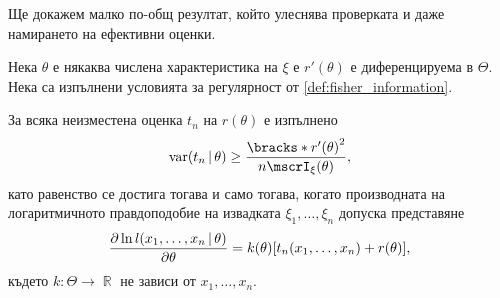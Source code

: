 \documentclass{../../common/topic}
\begin{document}
Ще докажем малко по-общ резултат, който улеснява проверката и даже намирането на ефективни оценки.
\begin{theorem}\label{thm:rao_cramer}
  Нека \( \theta \) е някаква числена характеристика на \( \xi \) е \( r'(\theta) \) е диференцируема в \( \Theta \). Нека са изпълнени условията за регулярност от \cref{def:fisher_information}.

  За всяка неизместена оценка \( t_n \) на \( r(\theta) \) е изпълнено
  \begin{equation*}
    \var(t_n \given \theta) \geq \frac {{\bracks*{r'(\theta) }}^2} {n \mscrI_\xi(\theta)},
  \end{equation*}
  като равенство се достига тогава и само тогава, когато производната на логаритмичното правдоподобие на извадката \( \xi_1, \ldots, \xi_n \) допуска представяне
  \begin{equation*}
    \frac {\partial \ln l(x_1, \ldots, x_n \given \theta)} {\partial \theta}
    =
    k(\theta) [t_n(x_1, \ldots, x_n) + r(\theta)],
  \end{equation*}
  където \( k: \Theta \to \BbbR \) не зависи от \( x_1, \ldots, x_n \).
\end{theorem}
\end{document}
